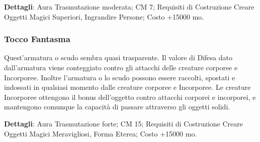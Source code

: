 \begin{multicols}{2}
\textbf{Dettagli}: Aura Trasmutazione moderata; CM 7; Requisiti di Costruzione Creare Oggetti Magici Superiori, Ingrandire Persone; Costo +15000 mo.

\subsubsection{Tocco Fantasma}

Quest'armatura o scudo sembra quasi trasparente. Il valore di Difesa dato dall'armatura viene conteggiato contro gli attacchi delle creature corporee e Incorporee. Inoltre l'armatura o lo scudo possono essere raccolti, spostati e indossati in qualsiasi momento dalle creature corporee e Incorporee. Le creature Incorporee ottengono il bonus dell'oggetto contro attacchi corporei e incorporei, e mantengono comunque la capacità di passare attraverso gli oggetti solidi.

\textbf{Dettagli}: Aura Trasmutazione forte; CM 15; Requisiti di Costruzione Creare Oggetti Magici Meravigliosi, Forma Eterea; Costo +15000 mo.
\end{multicols}